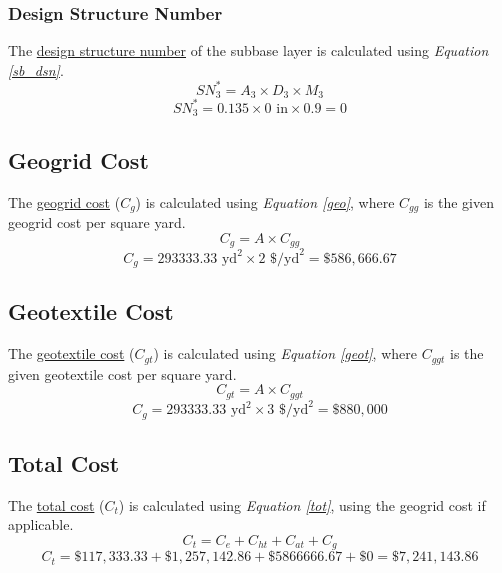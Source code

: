\documentclass{article}
\begin{document}
\subsubsection{Design Structure Number} 
\noindent The \underline{design structure number} of the subbase layer is calculated using \emph{Equation \ref{sb_dsn}}.
\begin{equation}\label{sb_dsn}SN_3^*=A_3\times D_3\times M_3\end{equation}
\[SN_3^*=0.135\times 0\text{ in}\times 0.9=\boxed{ 0}\]
\subsection{Geogrid Cost}
\noindent The \underline{geogrid cost} ($C_g$) is calculated using \emph{Equation \ref{geo}}, where $C_{gg}$ is the given geogrid cost per square yard.
\begin{equation}\label{geo}C_g=A\times C_{gg}\end{equation}
\[C_g=293333.33\text{ yd}^2\times 2 \text{ \$/yd}^2=\boxed{\$586,666.67}\] 
\subsection{Geotextile Cost}
\noindent The \underline{geotextile cost} ($C_{gt}$) is calculated using \emph{Equation \ref{geot}}, where $C_{ggt}$ is the given geotextile cost per square yard.
\begin{equation}\label{geot}C_{gt}=A\times C_{ggt}\end{equation}
\[C_g=293333.33\text{ yd}^2\times 3 \text{ \$/yd}^2=\boxed{\$880,000}\] 
\subsection{Total Cost}
\noindent The \underline{total cost} ($C_t$) is calculated using \emph{Equation \ref{tot}}, using the geogrid cost if applicable.
\begin{equation}\label{tot}C_t = C_e+C_{ht}+C_{at}+C_g\end{equation}
\[C_t = \$117,333.33+\$1,257,142.86+\$5866666.67+\$0=\boxed{\$7,241,143.86}\]
\newpage 
\end{document}
